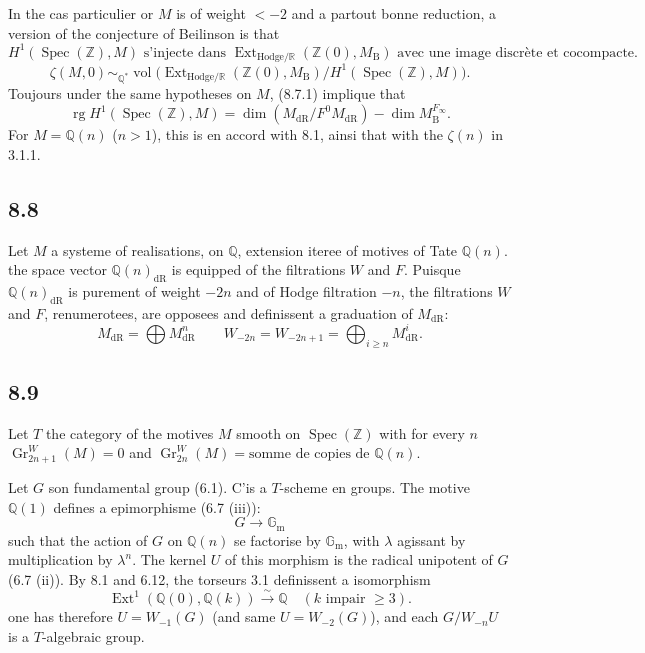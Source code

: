 \documentclass[12pt,a4paper]{article}
\theoremstyle{plain}
\theoremstyle{definition}
\theoremstyle{remark}
\DeclareMathOperator{\Spec}{Spec}
\DeclareMathOperator{\Ext}{Ext}
\DeclareMathOperator{\Gr}{Gr}
\DeclareMathOperator{\rank}{rg}
\DeclareMathOperator{\vol}{vol}
\newcommand{\DR}{\mathrm{dR}}
\newcommand{\B}{\mathrm{B}}
\newcommand{\Z}{\mathbb{Z}}
\newcommand{\Q}{\mathbb{Q}}
\newcommand{\R}{\mathbb{R}}
\newcommand{\Gm}{\mathbb{G}_\mathrm{m}}
\begin{document}
In the cas particulier or $M$ is of weight $< -2$ and a partout bonne reduction, a version of the conjecture of Beilinson is that
\begin{equation*}\tag{8.7.1}
H^1(\Spec(\Z), M) \text{ s'injecte dans } \Ext_{\mathrm{Hodge}/\R}(\Z(0), M_\B) \text{ avec une image discr\`ete et cocompacte.}
\end{equation*}
\begin{equation*}\tag{8.7.2}
\zeta(M, 0) \sim_{\Q^*} \vol\bigl(\Ext_{\mathrm{Hodge}/\R}(\Z(0), M_\B) / H^1(\Spec(\Z), M)\bigr).
\end{equation*}
Toujours under the same hypotheses on $M$, (8.7.1) implique that
\begin{equation*}\tag{8.7.3}
\rank H^1(\Spec(\Z), M) = \dim(M_\DR / F^0 M_\DR) - \dim M_\B^{F_\infty}.
\end{equation*}
For $M = \Q(n)$ ($n > 1$), this is en accord with 8.1, ainsi that with the $\zeta(n)$ in 3.1.1.

\subsection*{8.8}
Let $M$ a systeme of realisations, on $\Q$, extension iteree of motives of Tate $\Q(n)$. the space vector $\Q(n)_\DR$ is equipped of the filtrations $W$ and $F$. Puisque $\Q(n)_\DR$ is purement of weight $-2n$ and of Hodge filtration $-n$, the filtrations $W$ and $F$, renumerotees, are opposees and definissent a graduation of $M_\DR$:
\begin{equation*}\tag{8.8.1}
M_\DR = \bigoplus M_\DR^n \qquad W_{-2n} = W_{-2n+1} = \bigoplus_{i \geq n} M_\DR^i.
\end{equation*}

\subsection*{8.9}
Let $T$ the category of the motives $M$ smooth on $\Spec(\Z)$ with for every $n$ $\Gr^W_{2n+1}(M) = 0$ and $\Gr^W_{2n}(M) = \text{somme de copies de } \Q(n)$.

Let $G$ son fundamental group (6.1). C'is a $T$-scheme en groups. The motive $\Q(1)$ defines a epimorphisme (6.7 (iii)):
\begin{equation*}\tag{8.9.1}
G \longrightarrow \Gm
\end{equation*}
such that the action of $G$ on $\Q(n)$ se factorise by $\Gm$, with $\lambda$ agissant by multiplication by $\lambda^n$. The kernel $U$ of this morphism is the radical unipotent of $G$ (6.7 (ii)). By 8.1 and 6.12, the torseurs 3.1 definissent a isomorphism
\begin{equation*}\tag{8.9.2}
\Ext^1(\Q(0), \Q(k)) \xrightarrow{\sim} \Q \quad (k \text{ impair } \geq 3).
\end{equation*}
one has therefore $U = W_{-1}(G)$ (and same $U = W_{-2}(G)$), and each $G/W_{-n}U$ is a $T$-algebraic group.
\end{document}
